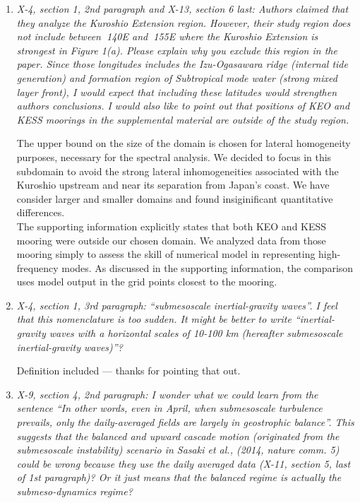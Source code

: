 \documentclass[11pt]{article}
\newcommand{\bdp}{\begin{description}}
\newcommand{\edp}{\end{description}}
\begin{document}
\begin{enumerate}

  \item {\it X-4, section 1, 2nd paragraph and X-13, section 6 last: Authors claimed that they
        analyze the Kuroshio Extension region. However, their study region does not
        include between $~$140E and $~$155E where the Kuroshio Extension is strongest in
        Figure 1(a). Please explain why you exclude this region in the paper. Since those
        longitudes includes the Izu-Ogasawara ridge (internal tide generation) and
        formation region of Subtropical mode water (strong mixed layer front), I would
        expect that including these latitudes would strengthen authors conclusions. I
        would also like to point out that positions of KEO and KESS moorings in the
        supplemental material are outside of the study region.}\\

        \bdp
             The upper bound on
             the size of the domain is chosen for lateral homogeneity purposes,
             necessary for the spectral analysis. We decided to focus in
             this subdomain to avoid the strong lateral inhomogeneities associated
             with the Kuroshio upstream and near its separation from Japan's coast.
             We have consider larger and smaller domains and found insiginificant
             quantitative differences.\\

             The supporting information explicitly states that both KEO and KESS
             mooring were outside our chosen domain. We analyzed data from those
             mooring simply to assess the skill of numerical model in representing
             high-frequency modes. As discussed in the supporting information, the
             comparison uses model output in the grid points closest
             to the mooring.
        \edp

  \item {\it X-4, section 1, 3rd paragraph: “submesoscale inertial-gravity waves”. I feel that this
        nomenclature is too sudden. It might be better to write “inertial-gravity waves
        with a horizontal scales of 10-100 km (hereafter submesoscale inertial-gravity
        waves)”?}\\

        \bdp
          Definition included --- thanks for pointing that out.
        \edp

  \item {\it X-9, section 4, 2nd paragraph: I wonder what we could learn from the sentence “In
          other words, even in April, when submesoscale turbulence prevails, only the
          daily-averaged fields are largely in geostrophic balance”. This suggests that the
          balanced and upward cascade motion (originated from the submesoscale
          instability) scenario in Sasaki et al., (2014, nature comm. 5) could be wrong
          because they use the daily averaged data (X-11, section 5, last of 1st paragraph)?
          Or it just means that the balanced regime is actually the submeso-dynamics
          regime?}


\end{enumerate}
\end{document}
